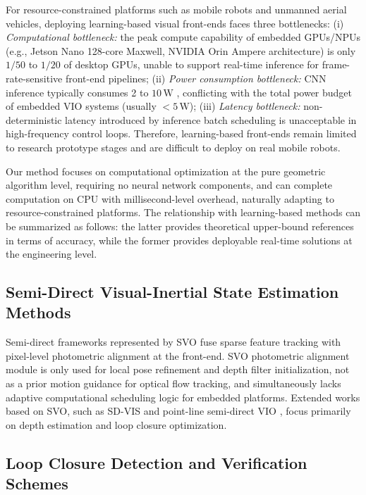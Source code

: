 \documentclass[journal,twoside,web]{ieeecolor}
\begin{document}
For resource-constrained platforms such as mobile robots and unmanned aerial vehicles, deploying learning-based visual front-ends faces three bottlenecks: (i) \textit{Computational bottleneck:} the peak compute capability of embedded GPUs/NPUs (e.g., Jetson Nano 128-core Maxwell, NVIDIA Orin Ampere architecture) is only $1/50$ to $1/20$ of desktop GPUs, unable to support real-time inference for frame-rate-sensitive front-end pipelines; (ii) \textit{Power consumption bottleneck:} CNN inference typically consumes 2 to $10\,\mathrm{W}$ \cite{kuhne2026levio}, conflicting with the total power budget of embedded VIO systems (usually $<5\,\mathrm{W}$); (iii) \textit{Latency bottleneck:} non-deterministic latency introduced by inference batch scheduling is unacceptable in high-frequency control loops. Therefore, learning-based front-ends remain limited to research prototype stages and are difficult to deploy on real mobile robots.

Our method focuses on computational optimization at the pure geometric algorithm level, requiring no neural network components, and can complete computation on CPU with millisecond-level overhead, naturally adapting to resource-constrained platforms. The relationship with learning-based methods can be summarized as follows: the latter provides theoretical upper-bound references in terms of accuracy, while the former provides deployable real-time solutions at the engineering level.

\subsection{Semi-Direct Visual-Inertial State Estimation Methods}

Semi-direct frameworks represented by SVO \cite{forster2014svo,forster2017svo} fuse sparse feature tracking with pixel-level photometric alignment at the front-end. SVO photometric alignment module is only used for local pose refinement and depth filter initialization, not as a prior motion guidance for optical flow tracking, and simultaneously lacks adaptive computational scheduling logic for embedded platforms. Extended works based on SVO, such as SD-VIS \cite{liu2020sdvis} and point-line semi-direct VIO \cite{gao2022sdplvio}, focus primarily on depth estimation and loop closure optimization.

\subsection{Loop Closure Detection and Verification Schemes}
\end{document}
